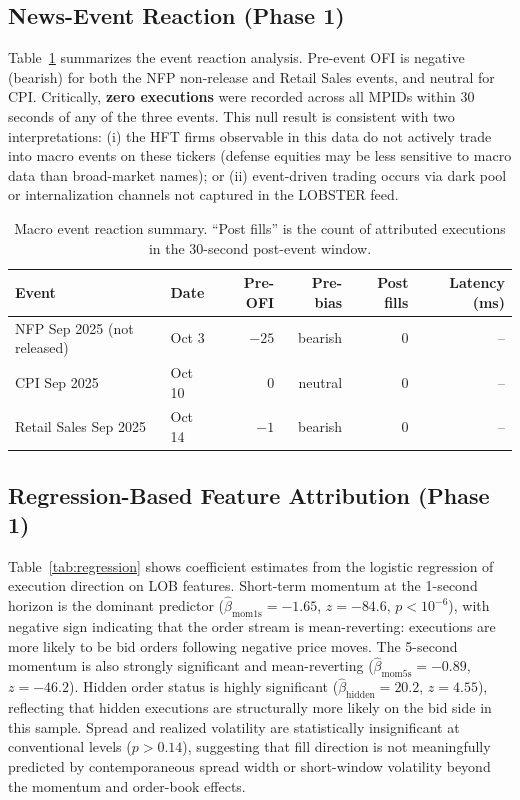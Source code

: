 \documentclass[11pt, letterpaper]{article}
\begin{document}
\subsection{News-Event Reaction (Phase 1)}

Table~\ref{tab:events} summarizes the event reaction analysis.
Pre-event OFI is negative (bearish) for both the NFP non-release and Retail
Sales events, and neutral for CPI.
Critically, \textbf{zero executions} were recorded across all MPIDs within
30 seconds of any of the three events.
This null result is consistent with two interpretations:
(i) the HFT firms observable in this data do not actively trade into macro
events on these tickers (defense equities may be less sensitive to
macro data than broad-market names); or (ii) event-driven trading occurs
via dark pool or internalization channels not captured in the LOBSTER feed.

\begin{table}[H]
\centering
\caption{Macro event reaction summary. ``Post fills'' is the count of
attributed executions in the 30-second post-event window.}
\label{tab:events}
\begin{tabular}{@{} l l r r r r @{}}
\toprule
\textbf{Event} & \textbf{Date} & \textbf{Pre-OFI} &
\textbf{Pre-bias} & \textbf{Post fills} & \textbf{Latency (ms)} \\
\midrule
NFP Sep 2025 (not released) & Oct 3 & $-25$ & bearish & 0 & -- \\
CPI Sep 2025                & Oct 10 & $0$ & neutral & 0 & -- \\
Retail Sales Sep 2025       & Oct 14 & $-1$ & bearish & 0 & -- \\
\bottomrule
\end{tabular}
\end{table}

\subsection{Regression-Based Feature Attribution (Phase 1)}

Table~\ref{tab:regression} shows coefficient estimates from the logistic
regression of execution direction on LOB features.
Short-term momentum at the 1-second horizon is the dominant predictor
($\hat{\beta}_{\text{mom1s}} = -1.65$, $z = -84.6$, $p < 10^{-6}$),
with negative sign indicating that the order stream is mean-reverting: executions
are more likely to be bid orders following negative price moves.
The 5-second momentum is also strongly significant and mean-reverting
($\hat{\beta}_{\text{mom5s}} = -0.89$, $z = -46.2$).
Hidden order status is highly significant ($\hat{\beta}_{\text{hidden}} = 20.2$,
$z = 4.55$), reflecting that hidden executions are structurally more likely
on the bid side in this sample.
Spread and realized volatility are statistically insignificant at conventional
levels ($p > 0.14$), suggesting that fill direction is not meaningfully
predicted by contemporaneous spread width or short-window volatility beyond
the momentum and order-book effects.
\end{document}
